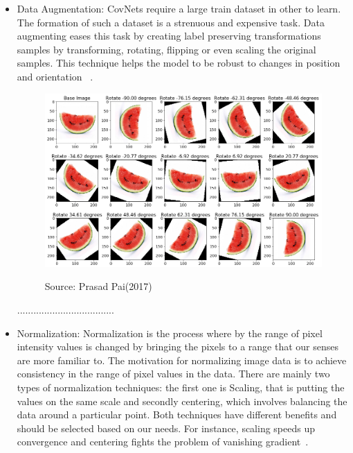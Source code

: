 \documentclass[12pt, a4paper,oneside]{report}
\newcommand{\source}[1]{\vspace{-3pt} \caption*{ Source: {#1}} }
\begin{document}
\begin{itemize}
 	\item Data Augmentation: CovNets require a large train dataset in other to learn. The formation of such a dataset is a strenuous and expensive task. Data augmenting eases this task by creating label preserving transformations samples by transforming, rotating, flipping or even scaling the original samples. This technique helps the model to be robust to changes in position and orientation ~\cite{taylor2017improving}. 
 	
 	\begin{figure}[!htb]
 		\includegraphics [scale=0.44] {augmentation.png}
 		\label{fig:augment}
 		\source{Prasad Pai(2017)~\cite{augement}}
 	\end{figure}
 
 ....................................
 \item Normalization: Normalization is the process where by the range of pixel intensity values is changed by bringing the pixels to a range that our senses are more familiar to. The motivation for normalizing image data is to achieve consistency in the range of pixel values in the data. There are mainly two types of normalization techniques: the first one is Scaling, that is putting the values on the same scale and secondly centering, which involves balancing the data around a particular point. Both techniques have different benefits and should be selected based on our needs. For instance, scaling speeds up convergence and centering fights the problem of vanishing gradient~\cite{normalizing}.

\end{itemize}
\end{document}

